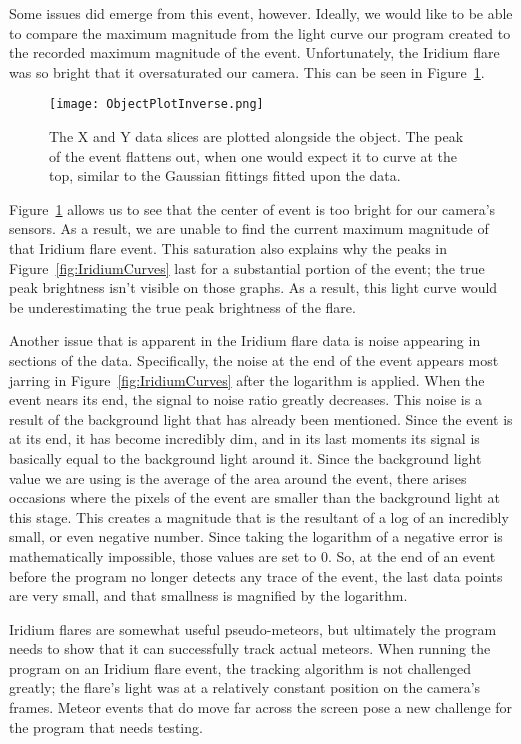 Some issues did emerge from this event, however. Ideally, we would like to be able to compare the maximum magnitude from the light curve our program created to the recorded maximum magnitude of the event. Unfortunately, the Iridium flare was so bright that it oversaturated our camera. This can be seen in Figure~\ref{fig:ObjectPlot055}.
\begin{figure}[ht!]
	\centering
	\texttt{[image: ObjectPlotInverse.png]}
	\caption{The X and Y data slices are plotted alongside the object. The peak of the event flattens out, when one would expect it to curve at the top, similar to the Gaussian fittings fitted upon the data.}
	\label{fig:ObjectPlot055}
\end{figure}
Figure~\ref{fig:ObjectPlot055} allows us to see that the center of event is too bright for our camera's sensors. As a result, we are unable to find the current maximum magnitude of that Iridium flare event. This saturation also explains why the peaks in Figure~\ref{fig:IridiumCurves} last for a substantial portion of the event; the true peak brightness isn't visible on those graphs. As a result, this light curve would be underestimating the true peak brightness of the flare.

Another issue that is apparent in the Iridium flare data is noise appearing in sections of the data. Specifically, the noise at the end of the event appears most jarring in Figure~\ref{fig:IridiumCurves} after the logarithm is applied. When the event nears its end, the signal to noise ratio greatly decreases. This noise is a result of the background light that has already been mentioned. Since the event is at its end, it has become incredibly dim, and in its last moments its signal is basically equal to the background light around it. Since the background light value we are using is the average of the area around the event, there arises occasions where the pixels of the event are smaller than the background light at this stage. This creates a magnitude that is the resultant of a log of an incredibly small, or even negative number. Since taking the logarithm of a negative error is mathematically impossible, those values are set to 0. So, at the end of an event before the program no longer detects any trace of the event, the last data points are very small, and that smallness is magnified by the logarithm.

Iridium flares are somewhat useful pseudo-meteors, but ultimately the program needs to show that it can successfully track actual meteors. When running the program on an Iridium flare event, the tracking algorithm is not challenged greatly; the flare's light was at a relatively constant position on the camera's frames. Meteor events that do move far across the screen pose a new challenge for the program that needs testing.

